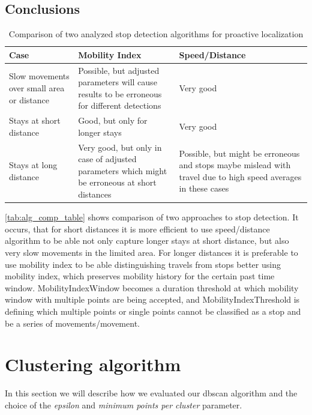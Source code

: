 \subsection{Conclusions}

\begin{table}[h!]
	\centering
	\caption{Comparison of two analyzed stop detection algorithms for proactive localization}
	\label{tab:alg_comp_table}
	\begin{tabular}{|L|L|L|}\hline
		\textbf{Case} & \textbf{Mobility Index} & \textbf{Speed/Distance} 
		\\\hline
		Slow movements over small area or distance & Possible, but adjusted parameters will cause results to be erroneous for different detections & Very good
		\\\hline
		Stays at short distance & Good, but only for longer stays & Very good  
		\\\hline
		Stays at long distance & Very good, but only in case of adjusted parameters which might be erroneous at short distances & Possible, but might be erroneous and stops maybe mislead with travel due to high speed averages in these cases
		\\\hline
	\end{tabular}
\end{table}
\FloatBarrier 

\autoref{tab:alg_comp_table} shows comparison of two approaches to stop detection. It occurs, that for short distances it is more efficient to use speed/distance algorithm to be able not only capture longer stays at short distance, but also very slow movements in the limited area. For longer distances it is preferable to use mobility index to be able distinguishing travels from stops better using mobility index, which preserves mobility history for the certain past time window. MobilityIndexWindow becomes a duration threshold at which mobility window with multiple points are being accepted, and MobilityIndexThreshold is defining which multiple points or single points cannot be classified as a stop and be a series of movements/movement. 

\section{Clustering algorithm}

In this section we will describe how we evaluated our dbscan algorithm and the choice of the \textit{epsilon} and \textit{minimum points per cluster} parameter.


